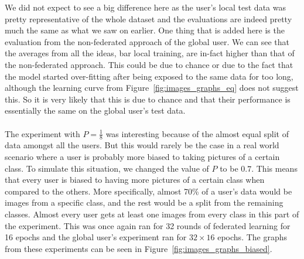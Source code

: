 \documentclass[12pt]{article}
\begin{document}
\noindent We did not expect to see a big difference here as the user's local test data was pretty representative of the whole dataset and the evaluations are indeed pretty much the same as what we saw on earlier. One thing that is added here is the evaluation from the non-federated approach of the global user. We can see that the averages from all the ideas, bar local training, are in-fact higher than that of the non-federated approach. This could be due to chance or due to the fact that the model started over-fitting after being exposed to the same data for too long, although the learning curve from Figure~\ref{fig:images_graphs_eq} does not suggest this. So it is very likely that this is due to chance and that their performance is essentially the same on the global user's test data.
\\\\
The experiment with $P=\frac{1}{8}$ was interesting because of the almost equal split of data amongst all the users. But this would rarely be the case in a real world scenario where a user is probably more biased to taking pictures of a certain class. To simulate this situation, we changed the value of $P$ to be $0.7$. This means that every user is biased to having more pictures of a certain class when compared to the others. More specifically, almost 70\% of a user's data would be images from a specific class, and the rest would be a split from the remaining classes. Almost every user gets at least one images from every class in this part of the experiment. This was once again ran for 32 rounds of federated learning for 16 epochs and the global user's experiment ran for $32 \times 16$ epochs. The graphs from these experiments can be seen in Figure~\ref{fig:images_graphs_biased}.
\end{document}
